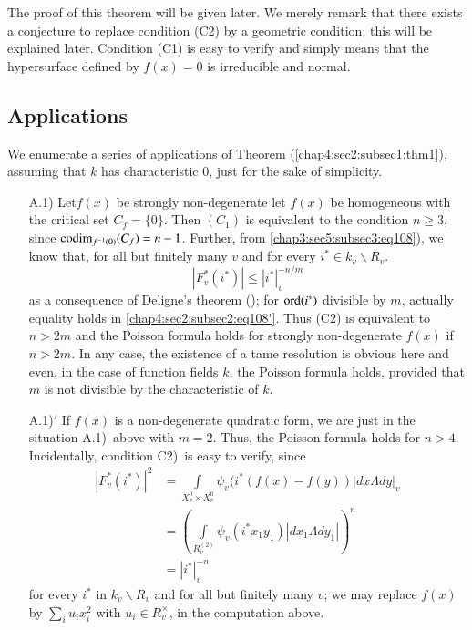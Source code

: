 The proof of this theorem will be given later. We merely remark that
there exists a conjecture to replace condition (C2) by a geometric
condition; this will be explained later. Condition (C1) is easy to
verify and simply means that the hypersurface defined by $f(x)=0$ is
irreducible and normal.

\subsection{Applications}\label{chap4:sec2:subsec2} %

We enumerate a series of applications of
Theorem (\ref{chap4:sec2:subsec1:thm1}),
assuming that $k$ has characteristic $0$, just for the sake of
simplicity.
\begin{itemize}
\item[A.1)] Let\pageoriginale $f(x)$ be strongly non-degenerate \ie
  let $f(x)$ be homogeneous with the critical set $C_{f}=\{0\}$. Then
  $(C_{1})$ is equivalent to the condition $n\geq 3$, since
  $\operatorname{codim}_{f^{-1}(0)}(C_{f})=n-1$. Further,
  from \ref{chap3:sec5:subsec3:eq108}),  we know
  that, for all but finitely many $v$ and for every $i^{\ast}\in
  k_{v}\backslash R_{v}$.
  \begin{equation*}
    |F^{\ast}_{v}(i^{\ast})|\leq
    |i^{\ast}|^{-n/m}_{v}\tag*{$(108)'$}\label{chap4:sec2:subsec2:eq108'} 
  \end{equation*}
  as a consequence of Deligne's theorem (\cite{Del}); for $\operatorname{ord}(i^{\ast})$
  divisible by $m$, actually equality holds
  in \ref{chap4:sec2:subsec2:eq108'}. Thus (C2) is
  equivalent to $n>2m$ and the Poisson formula holds for strongly
  non-degenerate $f(x)$ if $n>2m$. In any case, the existence of a tame
  resolution is obvious here and even, in the case of function fields
  $k$, the Poisson formula holds, provided that $m$ is not divisible by
  the characteristic of $k$.
  
\item[A.1)$'$] If $f(x)$ is a non-degenerate quadratic form, we are
  just in the situation A.1)~above with $m=2$. Thus, the Poisson
  formula holds for $n>4$. Incidentally, condition C2)~is easy to
  verify, since 
  \begin{align*}
    |F^{\ast}_{v}(i^{\ast})|^{2} &= \int\limits_{X^{0}_{v}\times
      X^{0}_{v}}\psi_{v}(i^{\ast}(f(x)-f(y))|dx\Lambda dy|_{v}\\
    &=\left(\int\limits_{R_{v}^{(2)}}\psi_{v}(i^{\ast}x_{1}y_{1})|dx_{1}\Lambda
    dy_{1}|\right)^{n}\\
    &= |i^{\ast}|^{-n}_{v}
  \end{align*}
  for every $i^{\ast}$ in $k_{v}\backslash R_{v}$ and for all but
  finitely many $v$; we may replace $f(x)$ by
  $\sum\limits_{i}u_{i}x^{2}_{i}$ with $u_{i}\in R^{\times}_{v}$, in the
  computation above.
  

\end{itemize}
